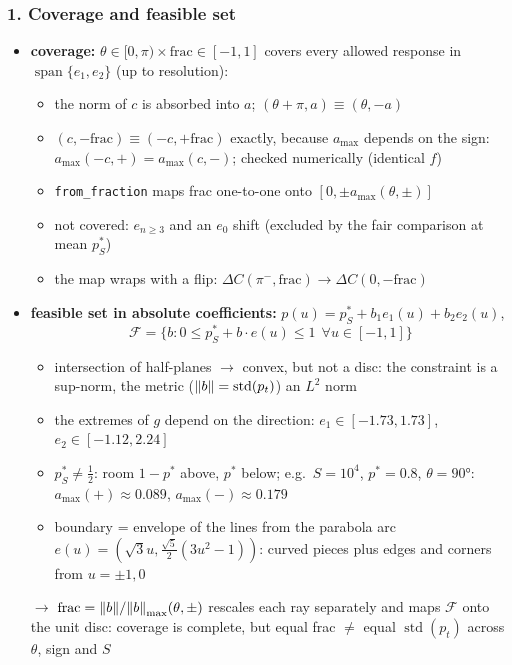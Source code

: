 \begin{sloppypar}
\subsubsection*{1. Coverage and feasible set}
\begin{itemize}
    \item \textbf{coverage:} $\theta \in [0, \pi) \times \text{frac} \in [-1, 1]$ covers every allowed response in
    $\operatorname{span}\{e_1, e_2\}$ (up to resolution):
    \begin{itemize}
        \item the norm of $c$ is absorbed into $a$; $(\theta + \pi, a) \equiv (\theta, -a)$
        \item $(c, -\text{frac}) \equiv (-c, +\text{frac})$ exactly, because $a_{\max}$ depends on the sign:
        $a_{\max}(-c, +) = a_{\max}(c, -)$; checked numerically (identical $f$)
        \item \texttt{from\_fraction} maps frac one-to-one onto $[0, \pm a_{\max}(\theta, \pm)]$
        \item not covered: $e_{n \ge 3}$ and an $e_0$ shift (excluded by the fair comparison at mean $p^*_S$)
        \item the map wraps with a flip: $\Delta C(\pi^-, \text{frac}) \to \Delta C(0, -\text{frac})$
    \end{itemize}
    \item \textbf{feasible set in absolute coefficients:} $p(u) = p^*_S + b_1 e_1(u) + b_2 e_2(u)$,
    \begin{equation*}
        \mathcal{F} = \{ b : 0 \le p^*_S + b \cdot e(u) \le 1 \ \ \forall u \in [-1, 1] \}
    \end{equation*}
    \begin{itemize}
        \item intersection of half-planes $\to$ convex, but not a disc: the constraint is a sup-norm, the metric
        ($\norm{b} = \operatorname{std}(p_t)$) an $L^2$ norm
        \item the extremes of $g$ depend on the direction: $e_1 \in [-1.73, 1.73]$, $e_2 \in [-1.12, 2.24]$
        \item $p^*_S \neq \tfrac{1}{2}$: room $1 - p^*$ above, $p^*$ below; e.g.\ $S = 10^4$, $p^* = 0.8$,
        $\theta = 90°$: $a_{\max}(+) \approx 0.089$, $a_{\max}(-) \approx 0.179$
        \item boundary = envelope of the lines from the parabola arc $e(u) = (\sqrt{3}u, \tfrac{\sqrt{5}}{2}(3u^2 - 1))$:
        curved pieces plus edges and corners from $u = \pm 1, 0$
    \end{itemize}
    $\to$ $\text{frac} = \norm{b} / \norm{b}_{\max}(\theta, \pm)$ rescales each ray separately and maps $\mathcal{F}$
    onto the unit disc: coverage is complete, but equal frac $\neq$ equal $\operatorname{std}(p_t)$ across
    $\theta$, sign and $S$
\end{itemize}


\end{sloppypar}
